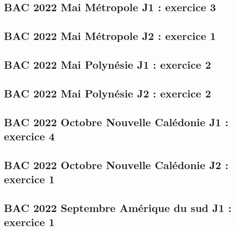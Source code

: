\documentclass[lang=fr,edition=teacher,layout=sheet]{mxbook}
\begin{document}
\begingroup\endgroup
\par\bigskip
{}\subsection*{BAC 2022 Mai Métropole J1 : exercice 3}
\begingroup\endgroup
\par\bigskip
{}\subsection*{BAC 2022 Mai Métropole J2 : exercice 1}
\begingroup\endgroup
\par\bigskip
{}\subsection*{BAC 2022 Mai Polynésie J1 : exercice 2}
\begingroup\endgroup
\par\bigskip
{}\subsection*{BAC 2022 Mai Polynésie J2 : exercice 2}
\begingroup\endgroup
\par\bigskip
{}\subsection*{BAC 2022 Octobre Nouvelle Calédonie J1 : exercice 4}
\begingroup\endgroup
\par\bigskip
{}\subsection*{BAC 2022 Octobre Nouvelle Calédonie J2 : exercice 1}
\begingroup\endgroup
\par\bigskip
{}\subsection*{BAC 2022 Septembre Amérique du sud J1 : exercice 1}
\end{document}
